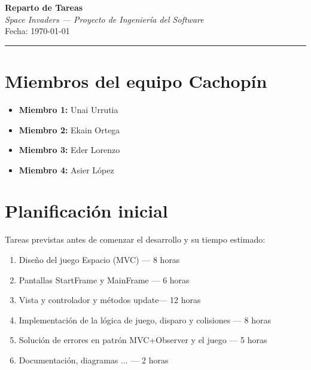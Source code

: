 \documentclass[12pt, a4paper]{article}
\begin{document}
\begin{center}
    {\LARGE \textbf{Reparto de Tareas}}\\[0.4em]
    {\large \textit{Space Invaders — Proyecto de Ingeniería del Software}}\\[0.3em]
    {\small Fecha: \today}
\end{center}

\vspace{1em}
\hrule
\vspace{1.5em}

\section{Miembros del equipo Cachopín}

\begin{itemize}[leftmargin=2em]
    \item \textbf{Miembro 1:} Unai Urrutia
    \item \textbf{Miembro 2:} Ekain Ortega
    \item \textbf{Miembro 3:} Eder Lorenzo
    \item \textbf{Miembro 4:} Asier López
\end{itemize}

\vspace{1.5em}

\section{Planificación inicial}

Tareas previstas antes de comenzar el desarrollo y su tiempo estimado:

\begin{enumerate}[leftmargin=2em]
    \item Diseño del juego Espacio (MVC) — 8 horas
    \item Pantallas StartFrame y MainFrame — 6 horas
    \item Vista y controlador y métodos update— 12 horas
    \item Implementación de la lógica de juego, disparo y colisiones — 8 horas
    \item Solución de errores en patrón MVC+Observer y el juego — 5 horas
    \item Documentación, diagramas ... — 2 horas
\end{enumerate}
\end{document}
